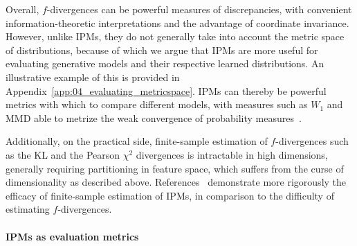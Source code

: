 
Overall, $f$-divergences can be powerful measures of discrepancies, with convenient information-theoretic interpretations and the advantage of coordinate invariance.
However, unlike IPMs, they do not generally take into account the metric space of distributions, because of which we argue that IPMs are more useful for evaluating generative models and their respective learned distributions.
An illustrative example of this is provided in Appendix~\ref{app:04_evaluating_metricspace}.
IPMs can thereby be powerful metrics with which to compare different models, with measures such as $W_1$ and MMD able to metrize the weak convergence of probability measures~\cite{villani_ot, simongabriel_mmdmetrizing}.


Additionally, on the practical side, finite-sample estimation of $f$-divergences such as the KL and the Pearson $\chi^2$ divergences is intractable in high dimensions, generally requiring partitioning in feature space, which suffers from the curse of dimensionality as described above.
References~\cite{sriperumbudur_empirical, sriperumbudur_ipms} demonstrate more rigorously the efficacy of finite-sample estimation of IPMs, in comparison to the difficulty of estimating $f$-divergences.

\paragraph{IPMs as evaluation metrics}
\label{sec:04_evaluating_ipms} 

